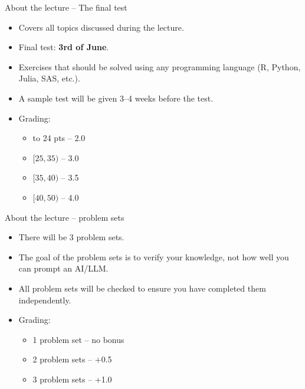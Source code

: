 \documentclass[10pt,ignorenonframetext,aspectratio=169]{beamer}
\begin{document}
\begin{frame}{About the lecture -- The final test}
\begin{itemize}
    \item Covers all topics discussed during the lecture.
    \item Final test: \textbf{3rd of June}. 
    \item Exercises that should be solved using any programming language (R, Python, Julia, SAS, etc.).
    \item A sample test will be given 3--4 weeks before the test.
    \item Grading:
    \begin{itemize}
        \item to 24 pts -- 2.0
        \item $[25, 35)$ -- 3.0
        \item $[35, 40)$ -- 3.5
        \item $[40, 50)$ -- 4.0
    \end{itemize}
\end{itemize}
\end{frame}

\begin{frame}{About the lecture -- problem sets}
\begin{itemize}
    \item There will be 3 problem sets.
    \item The goal of the problem sets is to verify your knowledge, not how well you can prompt an AI/LLM.
    \item All problem sets will be checked to ensure you have completed them independently.
    \item Grading:
    \begin{itemize}
        \item 1 problem set -- no bonus
        \item 2 problem sets -- +0.5
        \item 3 problem sets -- +1.0
    \end{itemize}
\end{itemize}
\end{frame}
\end{document}
